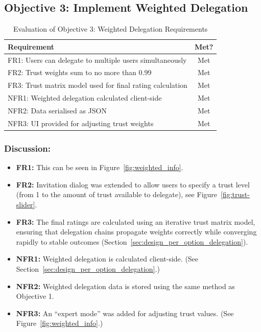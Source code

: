 \subsection{Objective 3: Implement Weighted Delegation}

\begin{table}[H]
\centering
\begin{tabular}{|p{9cm}|c|}
\hline
\textbf{Requirement} & \textbf{Met?} \\ \hline
FR1: Users can delegate to multiple users simultaneously & Met \\ \hline
FR2: Trust weights sum to no more than 0.99 & Met \\ \hline
FR3: Trust matrix model used for final rating calculation & Met \\ \hline
NFR1: Weighted delegation calculated client-side & Met \\ \hline
NFR2: Data serialised as JSON & Met \\ \hline
NFR3: UI provided for adjusting trust weights & Met \\ \hline
\end{tabular}
\caption{Evaluation of Objective 3: Weighted Delegation Requirements}
\label{tab:objective3_requirements}
\end{table}

\subsubsection{Discussion:}

\begin{itemize}
    \item \textbf{FR1:} This can be seen in Figure~\ref{fig:weighted_info}.
    \item \textbf{FR2:} Invitation dialog was extended to allow users to specify a trust level (from 1 to the amount of trust available to delegate), see Figure~\ref{fig:trust-slider}.
    \item \textbf{FR3:} The final ratings are calculated using an iterative trust matrix model, ensuring that delegation chains propagate weights correctly while converging rapidly to stable outcomes (Section~\ref{sec:design_per_option_delegation}).
    \item \textbf{NFR1:} Weighted delegation is calculated client-side. (See Section~\ref{sec:design_per_option_delegation}.)
    \item \textbf{NFR2:} Weighted delegation data is stored using the same method as Objective 1.
    \item \textbf{NFR3:} An ``expert mode'' was added for adjusting trust values. (See Figure~\ref{fig:weighted_info}.)

\end{itemize}


